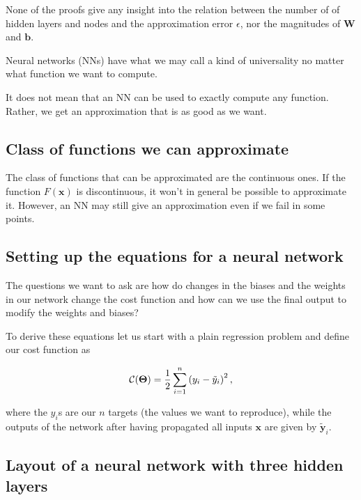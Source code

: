 \documentclass[%
oneside,                 %
final,                   %
10pt]{article}
\begin{document}
None of the proofs give any insight into the relation between the
number of of hidden layers and nodes and the approximation error
$\epsilon$, nor the magnitudes of $\bm{W}$ and $\bm{b}$.

Neural networks (NNs) have what we may call a kind of universality no matter what function we want to compute.

\begin{block}{}
It does not mean that an NN can be used to exactly compute any function. Rather, we get an approximation that is as good as we want. 
\end{block}

\subsection{Class of functions we can approximate}

\begin{block}{}
The class of functions that can be approximated are the continuous ones.
If the function $F(\bm{x})$ is discontinuous, it won't in general be possible to approximate it. However, an NN may still give an approximation even if we fail in some points.
\end{block}

\subsection{Setting up the equations for a neural network}

The questions we want to ask are how do changes in the biases and the
weights in our network change the cost function and how can we use the
final output to modify the weights and biases?

To derive these equations let us start with a plain regression problem
and define our cost function as

\[
{\cal C}(\bm{\Theta})  =  \frac{1}{2}\sum_{i=1}^n\left(y_i - \tilde{y}_i\right)^2, 
\]

where the $y_i$s are our $n$ targets (the values we want to
reproduce), while the outputs of the network after having propagated
all inputs $\bm{x}$ are given by $\bm{\tilde{y}}_i$.

\subsection{Layout of a neural network with three hidden layers}

\vspace{6mm}
\end{document}
